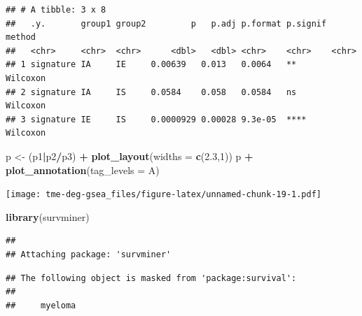 \documentclass[
  12pt,
]{book}
\newenvironment{Shaded}{\begin{snugshade}}{\end{snugshade}}
\newcommand{\AttributeTok}[1]{\textcolor[rgb]{0.13,0.29,0.53}{#1}}
\newcommand{\DecValTok}[1]{\textcolor[rgb]{0.00,0.00,0.81}{#1}}
\newcommand{\FloatTok}[1]{\textcolor[rgb]{0.00,0.00,0.81}{#1}}
\newcommand{\FunctionTok}[1]{\textcolor[rgb]{0.13,0.29,0.53}{\textbf{#1}}}
\newcommand{\NormalTok}[1]{#1}
\newcommand{\OtherTok}[1]{\textcolor[rgb]{0.56,0.35,0.01}{#1}}
\newcommand{\SpecialCharTok}[1]{\textcolor[rgb]{0.81,0.36,0.00}{\textbf{#1}}}
\newcommand{\StringTok}[1]{\textcolor[rgb]{0.31,0.60,0.02}{#1}}
\begin{document}
\begin{verbatim}
## # A tibble: 3 x 8
##   .y.       group1 group2         p   p.adj p.format p.signif method  
##   <chr>     <chr>  <chr>      <dbl>   <dbl> <chr>    <chr>    <chr>   
## 1 signature IA     IE     0.00639   0.013   0.0064   **       Wilcoxon
## 2 signature IA     IS     0.0584    0.058   0.0584   ns       Wilcoxon
## 3 signature IE     IS     0.0000929 0.00028 9.3e-05  ****     Wilcoxon
\end{verbatim}

\begin{Shaded}
\begin{Highlighting}[]
\NormalTok{p }\OtherTok{\textless{}{-}}\NormalTok{ (p1}\SpecialCharTok{|}\NormalTok{p2}\SpecialCharTok{/}\NormalTok{p3) }\SpecialCharTok{+} \FunctionTok{plot\_layout}\NormalTok{(}\AttributeTok{widths =} \FunctionTok{c}\NormalTok{(}\FloatTok{2.3}\NormalTok{,}\DecValTok{1}\NormalTok{))}
\NormalTok{p }\SpecialCharTok{+} \FunctionTok{plot\_annotation}\NormalTok{(}\AttributeTok{tag\_levels =} \StringTok{\textquotesingle{}A\textquotesingle{}}\NormalTok{)}
\end{Highlighting}
\end{Shaded}

\texttt{[image: tme-deg-gsea\_files/figure-latex/unnamed-chunk-19-1.pdf]}

\begin{Shaded}
\begin{Highlighting}[]
\FunctionTok{library}\NormalTok{(survminer)}
\end{Highlighting}
\end{Shaded}

\begin{verbatim}
## 
## Attaching package: 'survminer'
\end{verbatim}

\begin{verbatim}
## The following object is masked from 'package:survival':
## 
##     myeloma
\end{verbatim}
\end{document}
